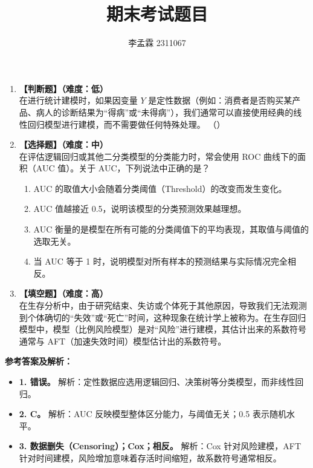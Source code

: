 \documentclass[11pt, a4paper]{article}
\title{\textbf{期末考试题目}}
\author{李孟霖 2311067}
\date{}
\begin{document}
\maketitle{}

\begin{enumerate}
    \item \textbf{【判断题】（难度：低）} \\
    在进行统计建模时，如果因变量 $Y$ 是定性数据（例如：消费者是否购买某产品、病人的诊断结果为“得病”或“未得病”），我们通常可以直接使用经典的线性回归模型进行建模，而不需要做任何特殊处理。 \hfill （\quad）

    \vspace{2em}

    \item \textbf{【选择题】（难度：中）} \\
    在评估逻辑回归或其他二分类模型的分类能力时，常会使用 ROC 曲线下的面积（AUC 值）。关于 AUC，下列说法中正确的是？
    \begin{enumerate}
        \item AUC 的取值大小会随着分类阈值（Threshold）的改变而发生变化。
        \item AUC 值越接近 0.5，说明该模型的分类预测效果越理想。
        \item AUC 衡量的是模型在所有可能的分类阈值下的平均表现，其取值与阈值的选取无关。
        \item 当 AUC 等于 1 时，说明模型对所有样本的预测结果与实际情况完全相反。
    \end{enumerate}

    \vspace{2em}

    \item \textbf{【填空题】（难度：高）} \\
    在生存分析中，由于研究结束、失访或个体死于其他原因，导致我们无法观测到个体确切的“失效”或“死亡”时间，这种现象在统计学上被称为\underline{\hspace{4em}}。在生存回归模型中，\underline{\hspace{4em}}模型（比例风险模型）是对“风险”进行建模，其估计出来的系数符号通常与 AFT（加速失效时间）模型估计出的系数符号\underline{\hspace{4em}}。

\end{enumerate}

\vspace{4em}

\textbf{参考答案及解析：}
\begin{itemize}
    \item \textbf{1. 错误。} 解析：定性数据应选用逻辑回归、决策树等分类模型，而非线性回归。
    \item \textbf{2. C。} 解析：AUC 反映模型整体区分能力，与阈值无关；0.5 表示随机水平。
    \item \textbf{3. 数据删失（Censoring）；Cox；相反。} 解析：Cox 针对风险建模，AFT 针对时间建模，风险增加意味着存活时间缩短，故系数符号通常相反。
\end{itemize}
\end{document}
